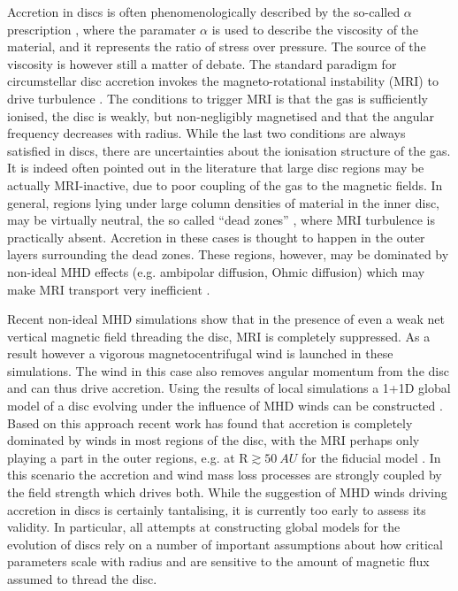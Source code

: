 \documentclass{rsos}
\begin{document}
Accretion in discs is often phenomenologically described by the so-called $\alpha$ prescription \cite{1973A&A....24..337S}, where the paramater $\alpha$ is used to describe the viscosity of the material, and it represents the ratio of stress over pressure. The source of the viscosity is however still a matter of debate. The standard paradigm for circumstellar disc accretion invokes the magneto-rotational instability (MRI) to drive turbulence 
\cite{1991ApJ...376..214B}. The conditions to trigger MRI is that the gas is sufficiently ionised, the disc is weakly, but non-negligibly magnetised and that the angular frequency decreases with radius. While the last two conditions are always satisfied in discs, there are uncertainties about the ionisation structure of the gas. 
It is indeed often pointed out in the literature that large disc regions may be actually MRI-inactive, due to poor coupling of the gas to the magnetic fields. In general, regions lying under large column densities of material in the inner disc, may be virtually neutral, the so called ``dead zones'' 
\cite{1996ApJ...457..355G}, where MRI turbulence is practically absent. Accretion in these cases is thought to happen in the outer layers surrounding the dead zones. These regions, however, may be dominated by non-ideal MHD effects (e.g. ambipolar diffusion, Ohmic diffusion) which may make MRI transport very inefficient 
\cite{2014ApJ...783...14T}. 

Recent non-ideal MHD simulations 
\cite{2013ApJ...769...76B,2016arXiv161203912B} show that in the presence of even a weak net vertical magnetic field threading the disc, MRI is completely suppressed. As a result however a vigorous magnetocentrifugal wind is launched in these simulations. The wind in this case also removes angular momentum from the disc and can thus drive accretion. Using the results of local simulations a 1+1D global model of a disc evolving under the influence of MHD winds can be constructed \cite{2013ApJ...769...76B, 2016ApJ...821...80B}. Based on this approach recent work has found that accretion is completely dominated by winds in most regions of the disc, with the MRI perhaps only playing a part in the outer regions, e.g. at R$\gtrsim50~AU$ for the fiducial model  \cite{2016ApJ...821...80B}. In this scenario the accretion and wind mass loss processes are strongly coupled by the field strength which drives both. While the suggestion of MHD winds driving accretion in discs is certainly tantalising, it is currently too early to assess its validity. In particular, all attempts at constructing global models for the evolution of discs rely on a number of important assumptions about how critical parameters scale with radius \cite{2016ApJ...821...80B} and are sensitive to the amount of magnetic flux assumed to thread the disc. 
\end{document}
